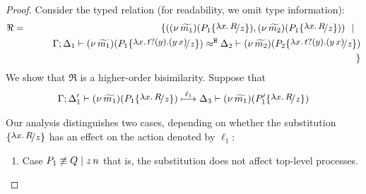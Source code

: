 \begin{proof}
	Consider the typed relation (for readability, we omit type information):
	\begin{eqnarray*}
		\Re	&=&	\set{
					(\newsp{\widetilde{m_1}}{P_1 \subst{{\abs{x}{R}}}{z}}, \newsp{\widetilde{m_2}}{P_1 \subst{{\abs{x}{R}}}{z}})
					\setbar\\
			&&		\qquad \horel{\Gamma}{\Delta_1}{\newsp{\widetilde{m_1}}{P_1 \subst{\trvalx{t}}{z} }}
					{\hwb}
					{\Delta_2}{\newsp{\widetilde{m_2}}{P_2 \subst{\trvalx{t}}{z} }}
			\\
			&&		}
	\end{eqnarray*}
	We show that $\Re$ is a higher-order bisimilarity. Suppose that 
	\begin{eqnarray}
		\horel{\Gamma}{\Delta_1'}{\newsp{\widetilde{m_1}}{P_1 \subst{{\abs{x}{R}}}{z} }}
		{\hby{\ell_1}}
		{\Delta_3}{\newsp{\widetilde{m_1}}{P_1' \subst{{\abs{x}{R}}}{z} }}
		\label{lem:proc_subst1}
	\end{eqnarray}

	Our analysis distinguishes two cases, depending on whether the substitution $\subst{{\abs{x}{R}}}{z}$ has an effect on the action denoted by $\ell_1$:
	\begin{enumerate}
		\item	Case $P_1 \not\equiv Q \;|\; z\, {n}$ that is, the substitution does not affect top-level processes. 


\end{enumerate}
\end{proof}
